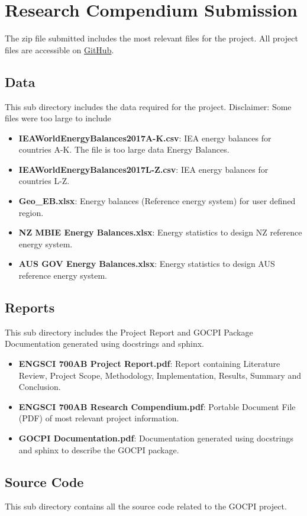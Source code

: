 \documentclass[12pt]{article}
\begin{document}
\tableofcontents
\listoffigures
\newpage
\section{Research Compendium Submission}
The zip file submitted includes the most relevant files for the project.
All project files are accessible on \href{https://github.com/CMCD1996/GOCPI}{GitHub}.
\subsection{Data}
This sub directory includes the data required for the project.
Disclaimer: Some files were too large to include 
\begin{itemize}
    \item \textbf{IEAWorldEnergyBalances2017A-K.csv}: IEA energy balances for countries A-K. The file is too large data Energy Balances.
    \item \textbf{IEAWorldEnergyBalances2017L-Z.csv}: IEA energy balances for countries L-Z.
    \item \textbf{Geo\_EB.xlsx}: Energy balances (Reference energy system) for user defined region.
    \item \textbf{NZ MBIE Energy Balances.xlsx}: Energy statistics to design NZ reference energy system.
    \item \textbf{AUS GOV Energy Balances.xlsx}: Energy statistics to design AUS reference energy system.
\end{itemize}
\subsection{Reports}
This sub directory includes the Project Report and GOCPI Package Documentation generated using docstrings and sphinx.
\begin{itemize}
    \item \textbf{ENGSCI 700AB Project Report.pdf}: Report containing Literature Review, Project Scope, Methodology, Implementation, Results, Summary and Conclusion.
    \item \textbf{ENGSCI 700AB Research Compendium.pdf}: Portable Document File (PDF) of most relevant project information.
    \item \textbf{GOCPI Documentation.pdf}: Documentation generated using docstrings and sphinx to describe the GOCPI package.
\end{itemize}
\subsection{Source Code}
This sub directory contains all the source code related to the GOCPI project.
\end{document}
